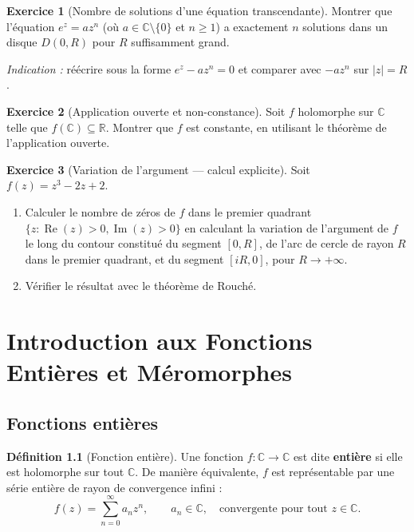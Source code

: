 \documentclass[12pt,a4paper,openany]{book}
\theoremstyle{definition}
\newtheorem{definition}{Définition}[chapter]
\newtheorem{exercice}{Exercice}[chapter]
\theoremstyle{plain}
\theoremstyle{remark}
\newcommand{\C}{\mathbb{C}}
\newcommand{\R}{\mathbb{R}}
\DeclareMathOperator{\re}{Re}
\DeclareMathOperator{\im}{Im}
\newcommand{\abs}[1]{\left|#1\right|}
\begin{document}
\begin{exercice}[Nombre de solutions d'une équation transcendante]\label{exo:eq-transcendante}
Montrer que l'équation $e^z = az^n$ (où $a \in \C \setminus \{0\}$ et $n \geq 1$)
a exactement $n$ solutions dans un disque $D(0,R)$ pour $R$ suffisamment grand.

\textit{Indication :} réécrire sous la forme $e^z - az^n = 0$ et comparer
avec $-az^n$ sur $\abs{z} = R$.
\end{exercice}

\begin{exercice}[Application ouverte et non-constance]\label{exo:app-ouverte}
Soit $f$ holomorphe sur $\C$ telle que $f(\C) \subseteq \R$. Montrer que $f$
est constante, en utilisant le théorème de l'application ouverte.
\end{exercice}

\begin{exercice}[Variation de l'argument — calcul explicite]\label{exo:variation-arg}
Soit $f(z) = z^3 - 2z + 2$.
\begin{enumerate}[label=(\alph*)]
  \item Calculer le nombre de zéros de $f$ dans le premier quadrant
    $\{z : \re(z) > 0, \im(z) > 0\}$ en calculant la variation de l'argument
    de $f$ le long du contour constitué du segment $[0, R]$, de l'arc de cercle
    de rayon $R$ dans le premier quadrant, et du segment $[iR, 0]$, pour
    $R \to +\infty$.
  \item Vérifier le résultat avec le théorème de Rouché.
\end{enumerate}
\end{exercice}


\chapter{Introduction aux Fonctions Entières et Méromorphes}\label{ch:entieres-meromorphes}

\section{Fonctions entières}\label{sec:fonctions-entieres}

\begin{definition}[Fonction entière]\label{def:fonction-entiere}
Une fonction $f : \C \to \C$ est dite \textbf{entière} si elle est holomorphe
sur tout $\C$. De manière équivalente, $f$ est représentable par une série
entière de rayon de convergence infini :
\[
  f(z) = \sum_{n=0}^{\infty} a_n z^n, \qquad a_n \in \C,
  \quad \text{convergente pour tout } z \in \C.
\]
\end{definition}
\end{document}
